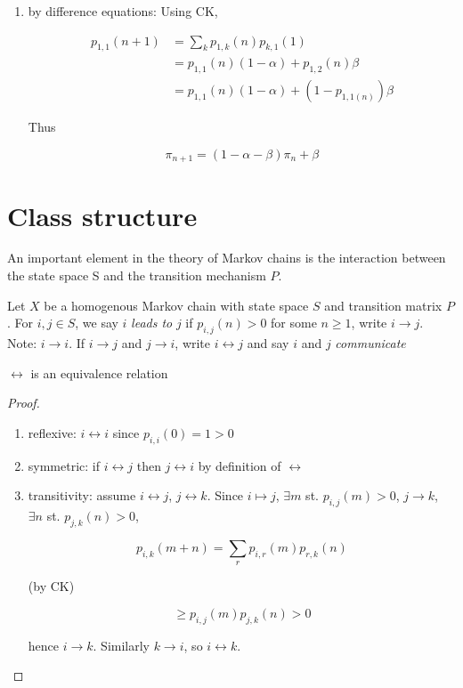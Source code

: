 \documentclass[a4paper]{article}
\begin{document}
\begin{eg}
\begin{enumerate}
	\item by difference equations:
	Using CK,
	
	\begin{align*}
	p_{1,1}(n+1) & = \sum_{k} p_{1,k}(n) p_{k,1}(1) \\
	& = p_{1,1}(n)(1-\alpha) + p_{1,2} (n) \beta   \\
	& =  p_{1,1}(n)(1-\alpha) + (1 - p_{1,1(n)}) \beta  
	\end{align*}
	
	Thus
	
	\[ \pi_{n+1} = (1 - \alpha - \beta)\pi_{n} + \beta \]
	

	
	
	
\end{enumerate}
\end{eg}

	\section{Class structure}
	
	An important element in the theory of Markov chains is the interaction between the state space S and the transition mechanism $ P $. 
	
	Let $ X $ be a homogenous Markov chain with state space $ S $ and transition matrix $ P $. For $ i,j \in S $, we say $ i $ \emph{leads to} $ j $ if $ p_{i,j}(n) > 0 $ for some $ n \geq 1 $, write $ i \to j $.
Note: $ i \to i $. If $ i \to j $ and  $ j \to i  $, write $ i \leftrightarrow j $ and say $ i $ and $ j $ \emph{communicate}

\begin{prop} 
	$ \leftrightarrow $ is an equivalence relation
\end{prop}

\begin{proof}
	\begin{enumerate}
		\item reflexive: $ i \leftrightarrow i $ since $ p_{i,i}(0) = 1 > 0 $
		\item symmetric: if $ i \leftrightarrow j $ then $ j \leftrightarrow i $ by definition of $ \leftrightarrow $
		\item transitivity: assume $ i \leftrightarrow j $, $ j \leftrightarrow k $. Since $ i \mapsto j $, $ \exists m $ st. $ p_{i,j}(m) > 0 $, $ j \to k $, $ \exists n $ st. $ p_{j,k}(n) > 0 $,
		
		\[ p_{i,k}(m + n) = \sum_{r}  p_{i,r}(m)p_{r,k}(n)  \]
		
		(by CK)
		
		\[ \geq p_{i,j}(m) p_{j,k}(n) > 0 \]
		
		hence $ i \to k $.
		Similarly $ k \to i $, so $ i \leftrightarrow k $.
		
	\end{enumerate}
\end{proof}
\end{document}
